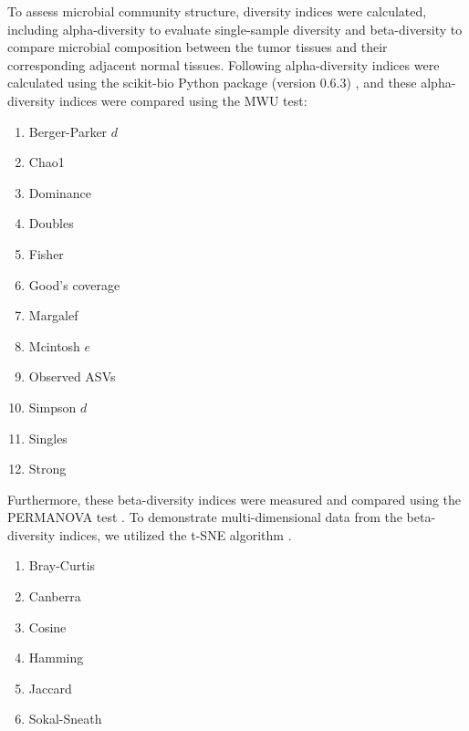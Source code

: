 \documentclass[11pt, a4paper, onecolumn, oneside]{report}
\begin{document}
                To assess microbial community structure, diversity indices were calculated, including alpha-diversity to evaluate single-sample diversity and beta-diversity to compare microbial composition between the tumor tissues and their corresponding adjacent normal tissues. Following alpha-diversity indices were calculated using the scikit-bio Python package (version 0.6.3) \cite{scikit-bio-1}, and these alpha-diversity indices were compared using the MWU test:
                \begin{enumerate}
                    \item Berger-Parker $d$ \cite{Berger-1}
                    \item Chao1 \cite{chao1-1}
                    \item Dominance
                    \item Doubles
                    \item Fisher \cite{fisher-1}
                    \item Good’s coverage \cite{goods-1}
                    \item Margalef \cite{margalef-1}
                    \item Mcintosh $e$ \cite{mcintosh-1}
                    \item Observed ASVs \cite{observed-ASVs-1}
                    \item Simpson $d$
                    \item Singles
                    \item Strong \cite{strong-1}
                \end{enumerate}

                Furthermore, these beta-diversity indices were measured and compared using the PERMANOVA test \cite{PERMANOVA-1, PERMANOVA-2}. To demonstrate multi-dimensional data from the beta-diversity indices, we utilized the t-SNE algorithm \cite{tSNE-1}.
                \begin{enumerate}
                    \item Bray-Curtis \cite{BrayCurtis-1}
                    \item Canberra
                    \item Cosine \cite{Cosine-1}
                    \item Hamming \cite{Hamming-1}
                    \item Jaccard \cite{Jaccard-1}
                    \item Sokal-Sneath \cite{Sokal-1}
                \end{enumerate}
\end{document}
